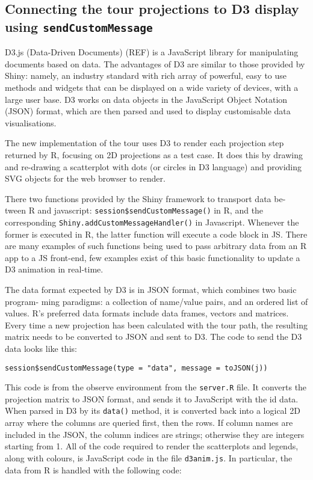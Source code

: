 \subsection{\texorpdfstring{Connecting the tour projections to D3
display using
\texttt{sendCustomMessage}}{Connecting the tour projections to D3 display using sendCustomMessage}}\label{connecting-the-tour-projections-to-d3-display-using-sendcustommessage}

D3.js (Data-Driven Documents) (REF) is a JavaScript library for
manipulating documents based on data. The advantages of D3 are similar
to those provided by Shiny: namely, an industry standard with rich array
of powerful, easy to use methods and widgets that can be displayed on a
wide variety of devices, with a large user base. D3 works on data
objects in the JavaScript Object Notation (JSON) format, which are then
parsed and used to display customisable data visualisations.

The new implementation of the tour uses D3 to render each projection
step returned by R, focusing on 2D projections as a test case. It does
this by drawing and re-drawing a scatterplot with dots (or circles in D3
language) and providing SVG objects for the web browser to render.

There two functions provided by the Shiny framework to transport data
be- tween R and javascript: \texttt{session\$sendCustomMessage()} in R,
and the corresponding \texttt{Shiny.addCustomMessageHandler()} in
Javascript. Whenever the former is executed in R, the latter function
will execute a code block in JS. There are many examples of such
functions being used to pass arbitrary data from an R app to a JS
front-end, few examples exist of this basic functionality to update a D3
animation in real-time.

The data format expected by D3 is in JSON format, which combines two
basic program- ming paradigms: a collection of name/value pairs, and an
ordered list of values. R's preferred data formats include data frames,
vectors and matrices. Every time a new projection has been calculated
with the tour path, the resulting matrix needs to be converted to JSON
and sent to D3. The code to send the D3 data looks like this:

\begin{verbatim}
session$sendCustomMessage(type = "data", message = toJSON(j))
\end{verbatim}

This code is from the observe environment from the \texttt{server.R}
file. It converts the projection matrix to JSON format, and sends it to
JavaScript with the id data. When parsed in D3 by its \texttt{data()}
method, it is converted back into a logical 2D array where the columns
are queried first, then the rows. If column names are included in the
JSON, the column indices are strings; otherwise they are integers
starting from 1. All of the code required to render the scatterplots and
legends, along with colours, is JavaScript code in the file
\texttt{d3anim.js}. In particular, the data from R is handled with the
following code:

